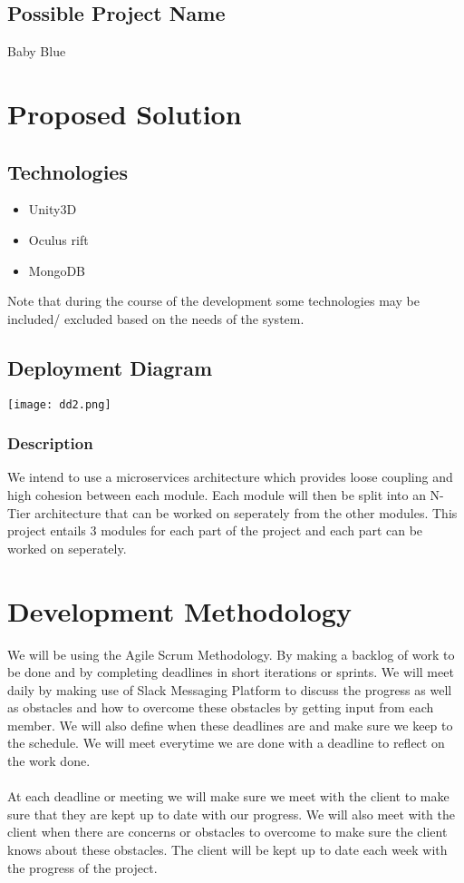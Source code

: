 \documentclass{article}
\begin{document}
\subsection{Possible Project Name}
Baby Blue

\newpage
\section{Proposed Solution}

\subsection{Technologies}
\begin{itemize}
	\item Unity3D
	\item Oculus rift
	\item MongoDB
\end{itemize}
Note that during the course of the development some technologies may be included/ excluded based on the needs of the system.
\subsection{Deployment Diagram}
\texttt{[image: dd2.png]} \\

\subsubsection{Description}
We intend to use a microservices architecture which provides loose coupling and high cohesion between each module. Each module will then be split into an N-Tier architecture that can be worked on seperately from the other modules. This project entails 3 modules for each part of the project and each part can be worked on seperately.
\section{Development Methodology}
We will be using the Agile Scrum Methodology. By making a backlog of work to be done and by completing deadlines in short iterations or sprints. We will meet daily by making use of  Slack Messaging Platform to discuss the progress as well as obstacles and how to overcome these obstacles by getting input from each member. We will also define when these deadlines are and make sure we keep to the schedule. We will meet everytime we are done with a deadline to reflect on the work done. \\ \\
At each deadline or meeting we will make sure we meet with the client to make sure that they are kept up to date with our progress. We will also meet with the client when there are concerns or obstacles to overcome to make sure the client knows  about these obstacles. The client will be kept up to date each week with the progress of the project.
\end{document}
